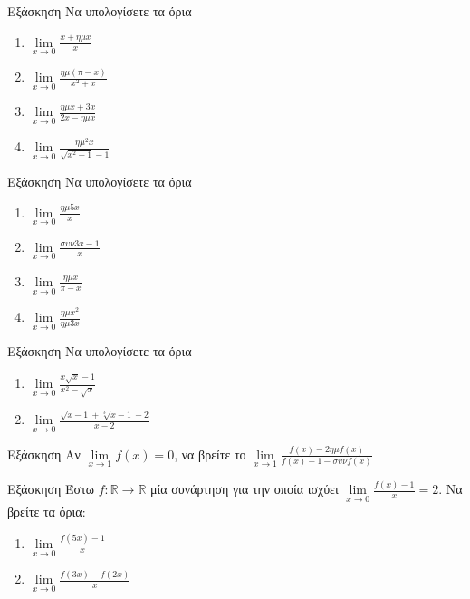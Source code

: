 \documentclass[greek]{beamer}
\begin{document}
\begin{frame}{Εξάσκηση}
 Να υπολογίσετε τα όρια
 \begin{enumerate}
  \item $\lim\limits_{x \to 0}{ \frac{x+ημx}{x} }$ \pause
  \item $\lim\limits_{x \to 0}{ \frac{ημ(π-x)}{x^2+x} }$ \pause
  \item $\lim\limits_{x \to 0}{ \frac{ημx+3x}{2x-ημx} }$ \pause
  \item $\lim\limits_{x \to 0}{ \frac{ημ^2x}{\sqrt{x^2+1}-1} }$
 \end{enumerate}
\end{frame}

\begin{frame}{Εξάσκηση}
 Να υπολογίσετε τα όρια
 \begin{enumerate}
  \item $\lim\limits_{x \to 0}{ \frac{ημ5x}{x} }$ \pause
  \item $\lim\limits_{x \to 0}{ \frac{συν3x-1}{x} }$ \pause
  \item $\lim\limits_{x \to 0}{ \frac{ημx}{π-x} }$ \pause
  \item $\lim\limits_{x \to 0}{ \frac{ημx^2}{ημ3x} }$
 \end{enumerate}
\end{frame}

\begin{frame}{Εξάσκηση}
 Να υπολογίσετε τα όρια
 \begin{enumerate}
  \item $\lim\limits_{x \to 0}{ \frac{x\sqrt{x}-1}{x^2-\sqrt{x}} }$ \pause
  \item $\lim\limits_{x \to 0}{ \frac{\sqrt{x-1}+\sqrt[3]{x-1}-2}{x-2} }$
 \end{enumerate}
\end{frame}

\begin{frame}{Εξάσκηση}
 Αν $\lim\limits_{x \to 1}{ f(x) }=0$, να βρείτε το $\lim\limits_{x \to 1}{ \frac{f(x)-2ημf(x)}{f(x)+1-συνf(x)} }$
\end{frame}

\begin{frame}{Εξάσκηση}
 Έστω $f:\mathbb{R}\to\mathbb{R}$ μία συνάρτηση για την οποία ισχύει $\lim\limits_{x \to 0}{ \frac{f(x)-1}{x} }=2$. Να βρείτε τα όρια:
 \begin{enumerate}
  \item $\lim\limits_{x \to 0}{ \frac{f(5x)-1}{x} }$ \pause
  \item $\lim\limits_{x \to 0}{ \frac{f(3x)-f(2x)}{x} }$
 \end{enumerate}
\end{frame}
\end{document}
